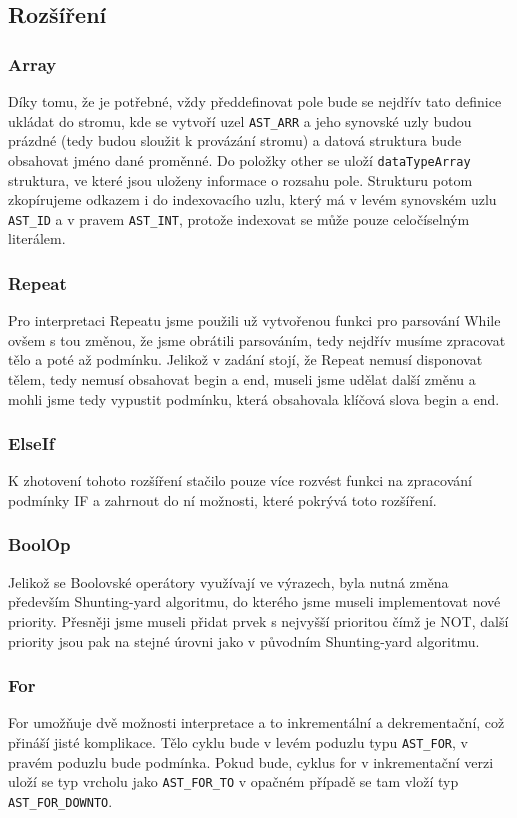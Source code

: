 \documentclass[12pt,a4paper,titlepage,final]{article}
\begin{document}
\subsection{Rozšíření}
\subsubsection{Array}
Díky tomu, že je potřebné, vždy předdefinovat pole bude se nejdřív tato definice ukládat do stromu, kde se vytvoří uzel \verb|AST_ARR| a jeho synovské uzly budou prázdné (tedy budou sloužit k provázání stromu) a datová struktura bude obsahovat jméno dané proměnné. Do položky other se uloží \verb|dataTypeArray| struktura, ve které jsou uloženy informace o rozsahu pole. Strukturu potom zkopírujeme odkazem i do indexovacího uzlu, který má v levém synovském uzlu \verb|AST_ID| a v pravem \verb|AST_INT|, protože indexovat se může pouze celočíselným literálem.
\subsubsection{Repeat}
Pro interpretaci Repeatu jsme použili už vytvořenou funkci pro parsování While ovšem s tou změnou, že jsme obrátili parsováním, tedy nejdřív musíme zpracovat tělo a poté až podmínku. Jelikož v zadání stojí, že Repeat nemusí disponovat tělem, tedy nemusí obsahovat begin a end, museli jsme udělat další změnu a mohli jsme tedy vypustit podmínku, která obsahovala klíčová slova begin a end.
\subsubsection{ElseIf}
K zhotovení tohoto rozšíření stačilo pouze více rozvést funkci na zpracování podmínky IF a zahrnout do ní možnosti, které pokrývá toto rozšíření.
\subsubsection{BoolOp}
Jelikož se Boolovské operátory využívají ve výrazech, byla nutná změna především Shunting-yard algoritmu, do kterého jsme museli implementovat nové priority. Přesněji jsme museli přidat prvek s nejvyšší prioritou čímž je NOT, další priority jsou pak na stejné úrovni jako v původním Shunting-yard algoritmu.
\subsubsection{For}
For umožňuje dvě možnosti interpretace a to inkrementální a dekrementační, což přináší jisté komplikace. Tělo cyklu bude v levém poduzlu typu \verb|AST_FOR|, v pravém poduzlu bude podmínka. Pokud bude, cyklus for v inkrementační verzi uloží se typ vrcholu jako \verb|AST_FOR_TO| v opačném případě se tam vloží typ \verb|AST_FOR_DOWNTO|.
\end{document}
